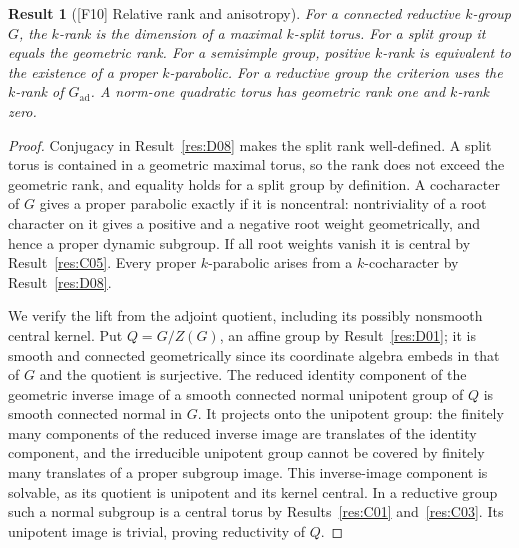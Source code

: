 \documentclass[11pt,a4paper,openany,oneside]{book}
\theoremstyle{resultstyle}
\newtheorem{statement}{Result}[chapter]
\newenvironment{result}[2]{\clubpenalty=10000\begin{statement}[\textnormal{[#1]} #2]\leavevmode\label{res:#1}\ignorespaces}{\end{statement}}
\theoremstyle{definition}
\numberwithin{equation}{chapter}
\begin{document}
\begin{result}{F10}{Relative rank and anisotropy}
For a connected reductive $k$-group $G$, the $k$-rank is the dimension of a maximal $k$-split torus. For a split group it equals the geometric rank. For a semisimple group, positive $k$-rank is equivalent to the existence of a proper $k$-parabolic. For a reductive group the criterion uses the $k$-rank of $G_{\mathrm{ad}}$. A norm-one quadratic torus has geometric rank one and $k$-rank zero.
\end{result}
\begin{proof}
Conjugacy in Result~\ref{res:D08} makes the split rank
well-defined. A split torus is contained in a geometric maximal
torus, so the rank does not exceed the geometric rank, and equality
holds for a split group by definition. A cocharacter of \(G\)
gives a proper parabolic exactly if it is noncentral: nontriviality
of a root character on it gives a positive and a negative root
weight geometrically, and hence a proper dynamic subgroup.
If all root weights vanish it is central by
Result~\ref{res:C05}. Every proper \(k\)-parabolic arises from
a \(k\)-cocharacter by Result~\ref{res:D08}.

We verify the lift from the adjoint quotient, including its
possibly nonsmooth central kernel. Put \(Q=G/Z(G)\), an
affine group by Result~\ref{res:D01}; it is smooth and
connected geometrically since its coordinate algebra embeds
in that of \(G\) and the quotient is surjective.
The reduced identity component of the geometric inverse
image of a smooth connected normal unipotent group of \(Q\)
is smooth connected normal in \(G\). It projects onto the
unipotent group: the finitely many components of the reduced
inverse image are translates of the identity component,
and the irreducible unipotent group cannot be covered by
finitely many translates of a proper subgroup image.
This inverse-image component is solvable, as its quotient
is unipotent and its kernel central. In a reductive group
such a normal subgroup is a central torus by
Results~\ref{res:C01} and~\ref{res:C03}.
Its unipotent image is trivial, proving reductivity of \(Q\).


\end{proof}
\end{document}
